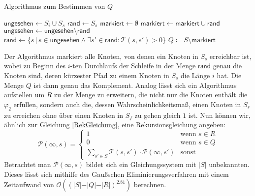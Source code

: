 \begin{algorithm}[h]
	\caption{Algorithmus zum Bestimmen von $Q$ \cite{hansson1994logic}}
	\label{IdentifyQ}
	\begin{algorithmic}
		\State $\mathsf{ungesehen} \gets S_i \cup S_s$
		\State $\mathsf{rand} \gets S_s$
		\State $\mathsf{markiert} \gets \emptyset$
		\State $\mathsf{markiert} \gets \mathsf{markiert}\cup \mathsf{rand}$
		\State $\mathsf{ungesehen} \gets \mathsf{ungesehen} \setminus \mathsf{rand}$
		\State $\mathsf{rand} \gets \{s \, | \, s\in \mathsf{ungesehen} \land \exists s'\in \mathsf{rand}:\mathcal{T}(s,s')>0\}$
		\EndFor
		\State $Q\coloneqq S \setminus \mathsf{markiert}$
	\end{algorithmic}
\end{algorithm}

Der Algorithmus markiert alle Knoten, von denen ein Knoten in $S_s$ erreichbar ist, wobei zu Beginn des $i$-ten Durchlaufs der Schleife in der Menge $\mathsf{rand}$ genau die Knoten sind, deren kürzester Pfad zu einem Knoten in $S_s$ die Länge $i$ hat.
Die Menge $Q$ ist dann genau das Komplement.
Analog lässt sich ein Algorithmus aufstellen um $R$ zu der Menge zu erweitern, die nicht nur die Knoten enthält die $\varphi_2$ erfüllen, sondern auch die, dessen Wahrscheinlichkeitsmaß, einen Knoten in $S_s$ zu erreichen ohne über einen Knoten in $S_f$ zu gehen gleich $1$ ist.
Nun können wir, ähnlich zur Gleichung \ref{RekGleichung}, eine Rekursionsgleichung angeben:
\begin{equation}
	\mathcal{P}(\infty, s) = \begin{cases}
		1 & \text{wenn } s\in R \\
		0 & \text{wenn } s\in Q \\
		\sum_{s'\in S} \mathcal{T}(s,s')\cdot \mathcal{P}(\infty, s') & \text{sonst}
	\end{cases}
\end{equation}
Betrachtet man $\mathcal{P}(\infty, s)$ bildet sich ein Gleichungssystem mit $\vert S \vert$ unbekannten. Dieses lässt sich mithilfe des Gaußschen Eliminierungsverfahren mit einem Zeitaufwand von $\mathcal{O}((\vert S \vert - \vert Q \vert - \vert R \vert)^2.81)$ berechnen. \cite{hansson1994logic}

